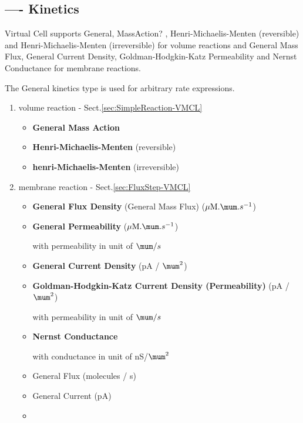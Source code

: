 \subsection{---- Kinetics}
\label{sec:Kinetics-VMCL}

Virtual Cell supports General,  MassAction? , Henri-Michaelis-Menten
(reversible) and Henri-Michaelis-Menten (irreversible) for volume reactions and
General Mass Flux, General Current Density, Goldman-Hodgkin-Katz Permeability
and Nernst Conductance for membrane reactions.

The General kinetics type is used for arbitrary rate expressions.

\begin{enumerate}
  \item volume reaction - Sect.\ref{sec:SimpleReaction-VMCL}
  \begin{itemize}
  \item {\bf General Mass Action}
  
  \item {\bf Henri-Michaelis-Menten} (reversible)
  
  \item {\bf henri-Michaelis-Menten} (irreversible)
  \end{itemize}

  \item membrane reaction - Sect.\ref{sec:FluxStep-VMCL}
  \begin{itemize}
  \item {\bf General Flux Density} (General Mass Flux) ($\muM.\mum.s^{-1}$)
  
  \item {\bf General Permeability} ($\muM.\mum.s^{-1}$)
  
with permeability in unit of $\mum/s$
  
  \item {\bf General Current Density} (pA / $\mum^2$)
  
  \item {\bf Goldman-Hodgkin-Katz Current Density (Permeability)} (pA /  $\mum^2$)
  
with permeability in unit of $\mum/s$
  
  
  \item {\bf Nernst Conductance}

with conductance in unit of nS/$\mum^2$


  \item General Flux (molecules / s)
  
  \item General Current (pA)
  
  \item 
  \end{itemize}
\end{enumerate}
 
